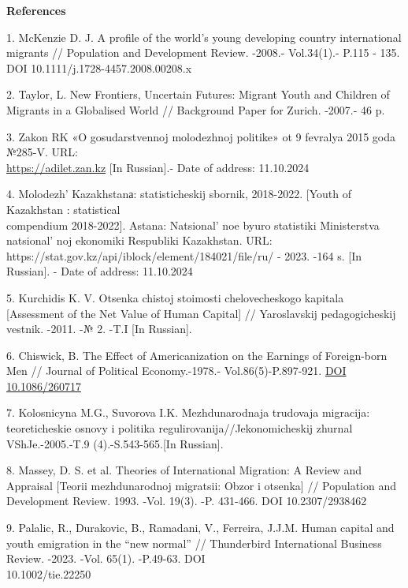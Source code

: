 \begin{center}
{\bfseries References}
\end{center}

\begin{references}
1. McKenzie D. J. A profile of the world's young developing country
international migrants // Population and Development Review. -2008.-
Vol.34(1).- P.115 - 135. DOI 10.1111/j.1728-4457.2008.00208.x

2. Taylor, L. New Frontiers, Uncertain Futures: Migrant Youth and
Children of Migrants in a Globalised World // Background Paper for
Zurich. -2007.- 46 p.

3. Zakon RK «O gosudarstvennoj molodezhnoj politike» ot 9 fevralya 2015
goda №285-V. URL: \\\href{https://adilet.zan.kz/rus/docs/Z1500000285}{https://adilet.zan.kz} {[}In
Russian{]}.- Date of address: 11.10.2024

4. Molodezh'{} Kazakhstanа: statisticheskij sbornik,
2018-2022. {[}Youth of Kazakhstan : statistical \\compendium 2018-2022{]}.
Astana: Natsional' noe byuro statistiki Ministerstva
natsional' noj ekonomiki Respubliki Kazakhstan. URL:
https://stat.gov.kz/api/iblock/element/184021/file/ru/ - 2023. -164 s.
{[}In Russian{]}. - Date of address: 11.10.2024

5. Kurchidis K. V. Otsenka chistoj stoimosti chelovecheskogo kapitala
{[}Assessment of the Net Value of Human Capital{]} // Yaroslavskij
pedagogicheskij vestnik. -2011. -№ 2. -T.I {[}In Russian{]}.

6. Chiswick, B. The Effect of Americanization on the Earnings of
Foreign-born Men // Journal of Political Economy.-1978.-
Vol.86(5)-P.897-921.
\href{https://econpapers.repec.org/scripts/redir.pf?u=http\%3A\%2F\%2Fdx.doi.org\%2F10.1086\%2F260717;h=repec:ucp:jpolec:v:86:y:1978:i:5:p:897-921}{DOI
10.1086/260717}~

7. Kolosnicyna M.G., Suvorova I.K. Mezhdunarodnaja trudovaja migracija:
teoreticheskie osnovy i politika regulirovanija//Jekonomicheskij zhurnal
VShJe.-2005.-T.9 (4).-S.543-565.{[}In Russian{]}.

8. Massey, D. S. et al. Theories of International Migration: A Review
and Appraisal {[}Teorii mezhdunarodnoj migratsii: Obzor i otsenka{]} //
Population and Development Review. 1993. -Vol. 19(3). -P. 431-466. DOI
10.2307/2938462

9. Palalic, R., Durakovic, B., Ramadani, V., Ferreira, J.J.M. Human
capital and youth emigration in the ``new normal'' // Thunderbird
International Business Review. -2023. -Vol. 65(1). -P.49-63. DOI\\
10.1002/tie.22250


\end{references}
